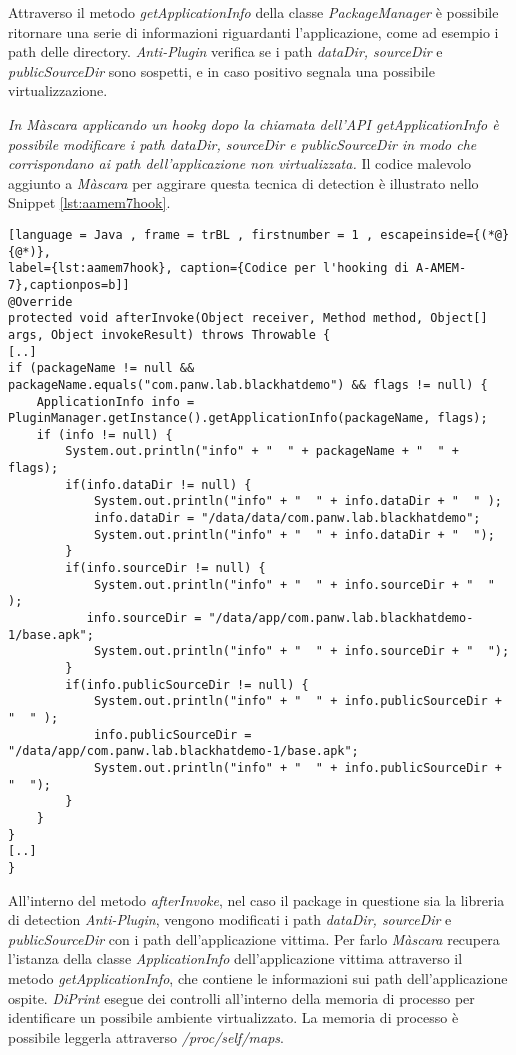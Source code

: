 Attraverso il metodo \emph{getApplicationInfo} della classe \emph{PackageManager} è possibile ritornare una serie di informazioni riguardanti l'applicazione, come ad esempio i path delle directory.
\emph{Anti-Plugin} verifica se i path \emph{dataDir, sourceDir} e \emph{publicSourceDir} sono sospetti, e in caso positivo segnala una possibile virtualizzazione.

\emph{In Màscara applicando un \gls{hookg} dopo la chiamata dell'API getApplicationInfo è possibile modificare i path dataDir, sourceDir e publicSourceDir in modo che corrispondano ai path dell'applicazione non virtualizzata.} Il codice malevolo aggiunto a \emph{Màscara} per aggirare questa tecnica di detection è illustrato nello Snippet \ref{lst:aamem7hook}.

\newpage

\begin{lstlisting}[language = Java , frame = trBL , firstnumber = 1 , escapeinside={(*@}{@*)},
label={lst:aamem7hook}, caption={Codice per l'hooking di A-AMEM-7},captionpos=b]]
@Override
protected void afterInvoke(Object receiver, Method method, Object[] args, Object invokeResult) throws Throwable {
[..]
if (packageName != null && packageName.equals("com.panw.lab.blackhatdemo") && flags != null) {
    ApplicationInfo info = PluginManager.getInstance().getApplicationInfo(packageName, flags);
    if (info != null) {
        System.out.println("info" + "  " + packageName + "  " + flags);
        if(info.dataDir != null) {
            System.out.println("info" + "  " + info.dataDir + "  " );
            info.dataDir = "/data/data/com.panw.lab.blackhatdemo";
            System.out.println("info" + "  " + info.dataDir + "  ");
        }
        if(info.sourceDir != null) {
            System.out.println("info" + "  " + info.sourceDir + "  " );
           info.sourceDir = "/data/app/com.panw.lab.blackhatdemo-1/base.apk";
            System.out.println("info" + "  " + info.sourceDir + "  ");
        }
        if(info.publicSourceDir != null) {
            System.out.println("info" + "  " + info.publicSourceDir + "  " );
            info.publicSourceDir = "/data/app/com.panw.lab.blackhatdemo-1/base.apk";
            System.out.println("info" + "  " + info.publicSourceDir + "  ");
        }
    }
}
[..]
}
\end{lstlisting}

All'interno del metodo \emph{afterInvoke}, nel caso il package in questione sia la libreria di detection \emph{Anti-Plugin}, vengono modificati i path \emph{dataDir, sourceDir} e \emph{publicSourceDir} con i path dell'applicazione vittima.
Per farlo \emph{Màscara} recupera l'istanza della classe \emph{ApplicationInfo} dell'applicazione vittima attraverso il metodo \emph{getApplicationInfo}, che contiene le informazioni sui path dell'applicazione ospite.
\emph{DiPrint} esegue dei controlli all'interno della memoria di processo per identificare un possibile ambiente virtualizzato. La memoria di processo è possibile leggerla attraverso \emph{/proc/self/maps}.


